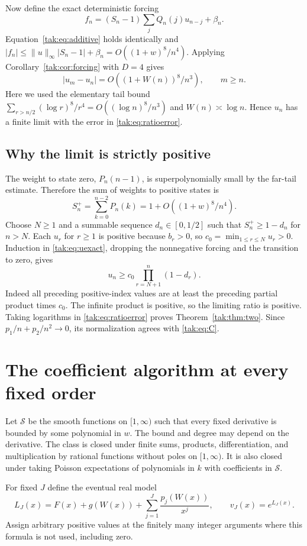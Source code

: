 \documentclass[11pt,letterpaper]{article}
\theoremstyle{remark}\newtheorem{remark}[theorem]{Remark}
\newcommand{\cS}{\mathcal S}\newcommand{\cL}{\mathcal L}
\begin{document}
Now define the exact deterministic forcing
\[
 f_n=(S_n-1)\sum_jQ_n(j)u_{n-j}+\beta_n.
\]
Equation~\eqref{tak:eq:additive} holds identically and
$|f_n|\leq\|u\|_\infty|S_n-1|+\beta_n=O((1+w)^8/n^4)$.
Applying Corollary~\ref{tak:cor:forcing} with $D=4$ gives
\begin{equation}
 |u_m-u_n|=O((1+W(n))^8/n^3),\qquad m\geq n.\label{tak:eq:ratioerror}
\end{equation}
Here we used the elementary tail bound
$\sum_{r>n/2}(\log r)^8/r^4=O((\log n)^8/n^3)$ and $W(n)\asymp\log n$. Hence $u_n$ has a finite limit with the error in \eqref{tak:eq:ratioerror}.

\subsection{Why the limit is strictly positive}
The weight to state zero, $P_n(n-1)$, is superpolynomially small by the far-tail estimate. Therefore the sum of weights to positive states is
\[
 S_n^+=\sum_{k=0}^{n-2}P_n(k)=1+O((1+w)^8/n^4).
\]
Choose $N\geq1$ and a summable sequence $d_n\in[0,1/2]$ such that $S_n^+\geq1-d_n$ for $n>N$. Each $u_r$ for $r\geq1$ is positive because $b_r>0$, so $c_0=\min_{1\leq r\leq N}u_r>0$. Induction in \eqref{tak:eq:uexact}, dropping the nonnegative forcing and the transition to zero, gives
\[
 u_n\geq c_0\prod_{r=N+1}^n(1-d_r).
\]
Indeed all preceding positive-index values are at least the preceding partial product times $c_0$. The infinite product is positive, so the limiting ratio is positive. Taking logarithms in \eqref{tak:eq:ratioerror} proves Theorem~\ref{tak:thm:two}. Since $p_1/n+p_2/n^2\to0$, its normalization agrees with \eqref{tak:eq:C}.

\section{The coefficient algorithm at every fixed order}\label{tak:sec:algorithm}
Let $\cS$ be the smooth functions on $[1,\infty)$ such that every fixed derivative is bounded by some polynomial in $w$. The bound and degree may depend on the derivative. The class is closed under finite sums, products, differentiation, and multiplication by rational functions without poles on $[1,\infty)$. It is also closed under taking Poisson expectations of polynomials in $k$ with coefficients in $\cS$.

For fixed $J$ define the eventual real model
\begin{equation}
 L_J(x)=F(x)+g(W(x))+\sum_{j=1}^J\frac{p_j(W(x))}{x^j},\qquad
 v_J(x)=e^{L_J(x)}.\label{tak:eq:LJ}
\end{equation}
Assign arbitrary positive values at the finitely many integer arguments where this formula is not used, including zero.
\end{document}
